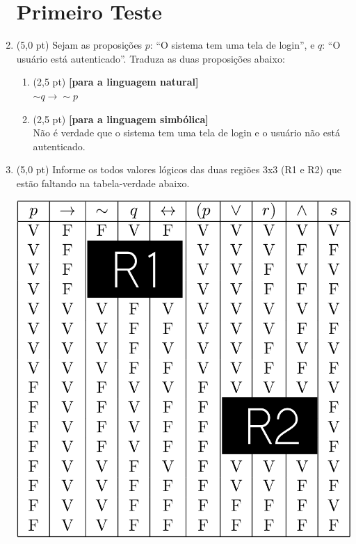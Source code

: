 \documentclass[12pt,a4paper,oneside]{article}
\begin{document}
\begin{enumerate}
	
	\section*{Primeiro Teste}
	
	\item (5,0 pt) Sejam as proposições $p$: ``O sistema tem uma tela de login'', e $q$: ``O usuário está autenticado''. Traduza as duas proposições abaixo:
	\begin{enumerate}
		\item (2,5 pt) {\bf [para a linguagem natural]} \\$\sim q \rightarrow \sim p$
		\vspace*{0.3cm}
		
		\item (2,5 pt) {\bf [para a linguagem simbólica]} \\Não é verdade que o sistema tem uma tela de login e o usuário não está autenticado.
	\end{enumerate}
	
	
	\item (5,0 pt) Informe os todos valores lógicos das duas regiões 3x3 (R1 e R2) que estão faltando na tabela-verdade abaixo.
		\begin{center}
			\includegraphics[width=\textwidth]{images/tv-regiao.png}
		\end{center}
	

\end{enumerate}
\end{document}

